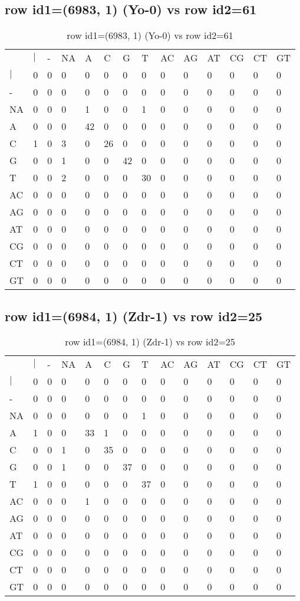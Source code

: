 \subsection{row id1=(6983, 1) (Yo-0) vs row id2=61}
\begin{center}
\begin{longtable}{|l|l|l|l|l|l|l|l|l|l|l|l|l|l|}
\caption{row id1=(6983, 1) (Yo-0) vs row id2=61} \label{table_dm208}\\
\hline
\\
\hline
&$|$&-&NA&A&C&G&T&AC&AG&AT&CG&CT&GT\\
$|$&0&0&0&0&0&0&0&0&0&0&0&0&0\\
-&0&0&0&0&0&0&0&0&0&0&0&0&0\\
NA&0&0&0&1&0&0&1&0&0&0&0&0&0\\
A&0&0&0&42&0&0&0&0&0&0&0&0&0\\
C&1&0&3&0&26&0&0&0&0&0&0&0&0\\
G&0&0&1&0&0&42&0&0&0&0&0&0&0\\
T&0&0&2&0&0&0&30&0&0&0&0&0&0\\
AC&0&0&0&0&0&0&0&0&0&0&0&0&0\\
AG&0&0&0&0&0&0&0&0&0&0&0&0&0\\
AT&0&0&0&0&0&0&0&0&0&0&0&0&0\\
CG&0&0&0&0&0&0&0&0&0&0&0&0&0\\
CT&0&0&0&0&0&0&0&0&0&0&0&0&0\\
GT&0&0&0&0&0&0&0&0&0&0&0&0&0\\
\hline
\end{longtable}
\end{center}

\subsection{row id1=(6984, 1) (Zdr-1) vs row id2=25}
\begin{center}
\begin{longtable}{|l|l|l|l|l|l|l|l|l|l|l|l|l|l|}
\caption{row id1=(6984, 1) (Zdr-1) vs row id2=25} \label{table_dm210}\\
\hline
\\
\hline
&$|$&-&NA&A&C&G&T&AC&AG&AT&CG&CT&GT\\
$|$&0&0&0&0&0&0&0&0&0&0&0&0&0\\
-&0&0&0&0&0&0&0&0&0&0&0&0&0\\
NA&0&0&0&0&0&0&1&0&0&0&0&0&0\\
A&1&0&0&33&1&0&0&0&0&0&0&0&0\\
C&0&0&1&0&35&0&0&0&0&0&0&0&0\\
G&0&0&1&0&0&37&0&0&0&0&0&0&0\\
T&1&0&0&0&0&0&37&0&0&0&0&0&0\\
AC&0&0&0&1&0&0&0&0&0&0&0&0&0\\
AG&0&0&0&0&0&0&0&0&0&0&0&0&0\\
AT&0&0&0&0&0&0&0&0&0&0&0&0&0\\
CG&0&0&0&0&0&0&0&0&0&0&0&0&0\\
CT&0&0&0&0&0&0&0&0&0&0&0&0&0\\
GT&0&0&0&0&0&0&0&0&0&0&0&0&0\\
\hline
\end{longtable}
\end{center}

